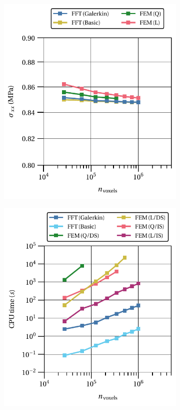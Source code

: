 \begin{figure}[hbt]
\centering
	\begin{subfigure}[b]{0.49\textwidth}
    \centering
    \includegraphics[width=\textwidth]{figures/linear_3D_normal_homo_stress_11_vs_n_voxels}
    \caption{}
    \label{subfig:linear_3D_normal_homo_stress_11_vs_n_voxels}
  \end{subfigure}
  \begin{subfigure}[b]{0.49\textwidth}
    \centering
    \includegraphics[width=\textwidth]{figures/linear_3D_normal_cpu_time_vs_n_voxels}

\end{subfigure}
\end{figure}
